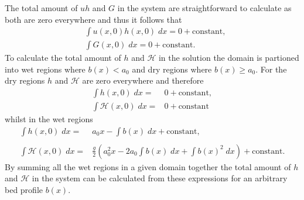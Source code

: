 The total amount of $uh$ and $G$ in the system are straightforward to calculate as both are zero everywhere and thus it follows that
\begin{align*}
&\int u(x,0)h(x,0) \;  dx = {} 0 + \text{constant}, \\
&\int G(x,0) \; dx = {} 0 + \text{constant}.
\end{align*}
To calculate the total amount of $h$ and $\mathcal{H}$ in the solution the domain is partioned into wet regions where $b(x) < a_0$ and dry regions where $b(x) \ge a_0$. For the dry regions $h$ and $\mathcal{H}$ are zero everywhere and therefore 
	\begin{align*}
	\int h(x,0) \; dx = {} & 0 + \text{constant} , \\
	\int \mathcal{H}(x,0) \; dx = {} & 0 + \text{constant}
	\end{align*}
whilst in the wet regions
\begin{subequations}
	\label{eqn:AppLARhwet}
	\begin{align}
	\int h(x,0) \; dx = {} & a_0 x -  \int b(x) \; dx  + \text{constant}, \\  \nonumber \\
	\int \mathcal{H}(x,0) \; dx = {} & \frac{g}{2} \left(a_0^2x  -  2a_0 \int b(x) \; dx + \int b(x)^2 \; dx \right) + \text{constant}.
	\end{align}
\end{subequations}
By summing all the wet regions in a given domain together the total amount of $h$ and $\mathcal{H}$ in the system can be calculated from these expressions for an arbitrary bed profile $b(x)$. 
